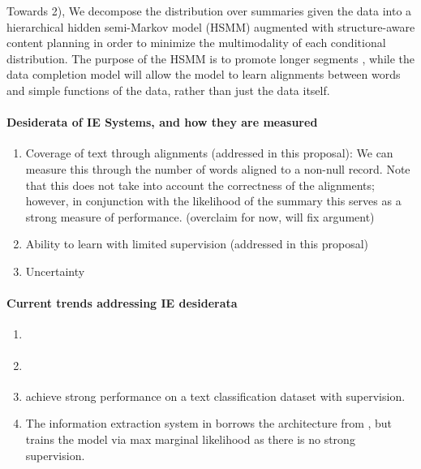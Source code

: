 \documentclass[11pt]{article}
\begin{document}
Towards 2), We decompose the distribution over summaries given the data into a hierarchical hidden semi-Markov model (HSMM)
\citep{liang2009semalign} augmented with structure-aware content planning
\citep{sauper2009wiki} in order to minimize the multimodality of each conditional distribution.
The purpose of the HSMM is to promote longer segments \citep{liang2009semalign},
while the data completion model will allow the model to learn alignments between
words and simple functions of the data, rather than just the data itself.

\paragraph{Desiderata of IE Systems, and how they are measured}
\begin{enumerate}
\item Coverage of text through alignments (addressed in this proposal):
We can measure this through the number of words aligned to a non-null record.
Note that this does not take into account the correctness of the alignments;
however, in conjunction with the likelihood of the summary this serves
as a strong measure of performance. (overclaim for now, will fix argument)
\item Ability to learn with limited supervision (addressed in this proposal)
\item Uncertainty
\end{enumerate}
\paragraph{Current trends addressing IE desiderata}
\begin{enumerate}
\item \citet{snyder2007d2t}
\item \citet{liang2009semalign}
\item \citet{dossantos2015classification} achieve strong performance on
a text classification dataset with supervision.
\item The information extraction system in \citet{wiseman2017d2t}
borrows the architecture from \citet{dossantos2015classification},
but trains the model via max marginal likelihood as there is
no strong supervision.
\end{enumerate}
\end{document}

